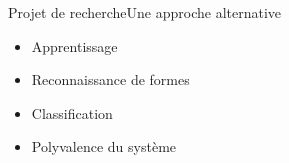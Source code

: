 \begin{frame}{Projet de recherche}{Une approche alternative}
\begin{itemize}
\item Apprentissage
\item Reconnaissance de formes
\item Classification
\item Polyvalence du système
\end{itemize}

\end{frame}
